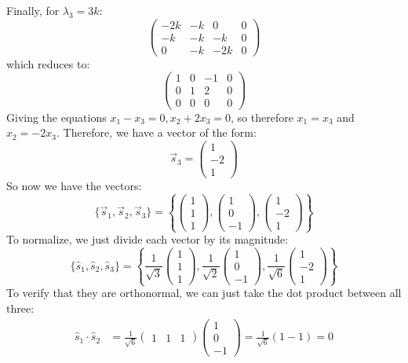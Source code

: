\documentclass{article}
\begin{document}
\begin{solution}
\[	\] 
	Finally, for $\lambda_3 = 3k$:
	\[
		\begin{pmatrix} -2k & -k & 0 &0\\ -k &-k &-k &0 \\ 0 &-k &-2k & 0 \end{pmatrix} 
	\] 
	which reduces to: 
	\[
		\begin{pmatrix} 1 & 0 &-1 & 0\\ 0 & 1 &2 & 0\\ 0&0&0&0 \end{pmatrix} 
	\] 
	Giving the equations $x_1 - x_3 = 0, x_2 + 2x_3 = 0$, so therefore $x_1 = x_3$ and $x_2 = -2x_3$. Therefore, 
	we have a vector of the form: 
	\[
		\vec s_3 =\begin{pmatrix} 1 \\ -2 \\1 \end{pmatrix} 
	\] 
	So now we have the vectors:
	\[
		\{\vec s_1, \vec s_2, \vec s_3\} = \left\{\begin{pmatrix} 1\\1\\1 \end{pmatrix}, \begin{pmatrix} 1\\0\\-1 \end{pmatrix}, \begin{pmatrix} 1\\-2\\1 \end{pmatrix} \right\}
	\] 
	To normalize, we just divide each vector by its magnitude:
	\[
		\{ \hat{s}_1, \hat{s}_2, \hat{s}_3\} = \left\{ \frac{1}{\sqrt{3} }
			\begin{pmatrix} 1\\1\\1 \end{pmatrix}, \frac{1}{\sqrt{2} }\begin{pmatrix} 1\\0\\-1 \end{pmatrix},
		\frac{1}{\sqrt{6} }\begin{pmatrix} 1\\-2\\1 \end{pmatrix} \right\}
	\]
	To verify that they are orthonormal, we can just take the dot product between all three:
	\begin{align*}
		\hat{s}_1 \cdot \hat{s}_2 &= \frac{1}{\sqrt{6} }\begin{pmatrix} 1 & 1 & 1 \end{pmatrix} \begin{pmatrix} 1 \\ 0 \\ -1 \end{pmatrix} = \frac{1}{\sqrt{6} }(1 - 1) = 0\\

\end{align*}
\end{solution}
\end{document}
